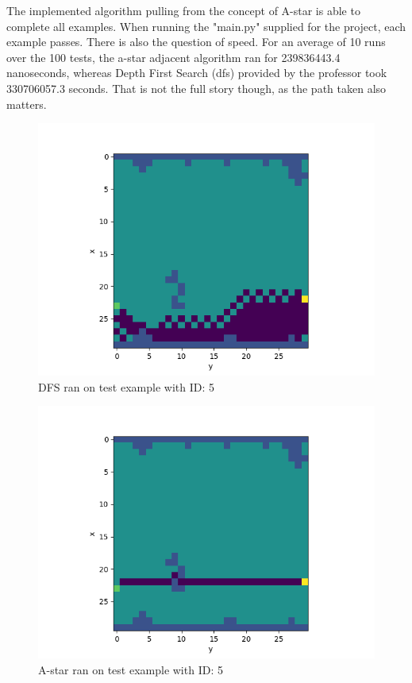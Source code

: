 \documentclass[letterpaper, 10 pt, conference]{ieeeconf}   %
\begin{document}
The implemented algorithm pulling from the concept of A-star is able to complete all examples. When running the "main.py" supplied for the project, each example passes. There is also the question of speed. For an average of 10 runs over the 100 tests, the a-star adjacent algorithm ran for 239836443.4 nanoseconds, whereas Depth First Search (dfs) provided by the professor took 330706057.3 seconds. That is not the full story though, as the path taken also matters.
\begin{figure}[thpb]
	\centering
	\includegraphics[scale=0.5]{images/ID5DFS.png}
	\caption{DFS ran on test example with ID: 5}
	\label{figurelabel}
\end{figure}
\begin{figure}[thpb]
	\centering
	\includegraphics[scale=0.5]{images/ID5A.png}
	\caption{A-star ran on test example with ID: 5}
	\label{figurelabel}
\end{figure}
\end{document}
